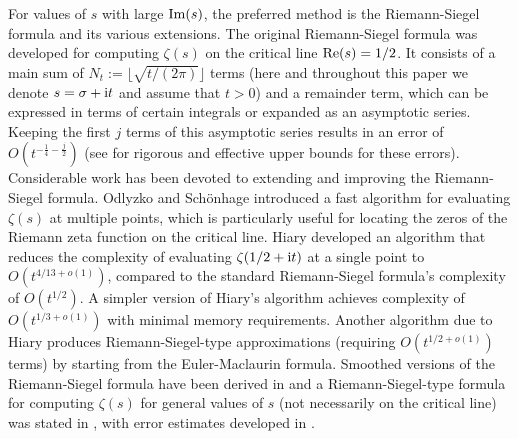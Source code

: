 \documentclass[12pt]{article}
\def\re{\textnormal {Re}}
\def\im{\textnormal {Im}}
\def\i{{\textnormal i}}
\theoremstyle{definition}
\begin{document}
For values of $s$ with large $\im(s)$, the preferred method is the Riemann-Siegel formula and its various extensions. The original Riemann-Siegel formula \cite{Borwein_2000, Gabcke1979,Rubinstein_2005,Titchmarsh1987} was developed for computing $\zeta(s)$ on the critical line $\re(s)=1/2$. It consists of a main sum of $N_t:=\lfloor \sqrt{t/(2\pi)} \rfloor$ terms (here and throughout this paper we denote $s=\sigma+ \i t$ and assume that $t>0$) and a remainder term, which can  be expressed in terms of certain integrals or expanded as an asymptotic series. Keeping the first $j$ terms of this asymptotic series results in an error of $O(t^{-\frac{1}{4} - \frac{j}{2} })$ (see \cite{Gabcke1979} for rigorous and effective upper bounds for these errors).  Considerable work has been devoted to  extending and improving the Riemann-Siegel formula.  Odlyzko and Sch\"onhage \cite{Odlyzko_1988} introduced a fast algorithm for evaluating $\zeta(s)$ at multiple points, which is particularly useful for locating the zeros of the Riemann zeta function on the critical line. Hiary  
\cite{Hiary_2011} developed an algorithm that reduces the complexity of evaluating $\zeta(1/2+\i t)$ at a single point to $O(t^{4/13+o(1)})$, compared to the standard Riemann-Siegel formula's complexity of $O(t^{1/2})$. A simpler  version of Hiary's algorithm \cite{Hiary_2011} achieves complexity of $O(t^{1/3+o(1)})$ with minimal memory requirements. 
Another algorithm due to Hiary \cite{Hiary_2016} produces Riemann-Siegel-type approximations (requiring $O(t^{1/2+o(1)})$ terms) by starting from the Euler-Maclaurin formula. 
Smoothed versions of the Riemann-Siegel formula have been derived in  \cite{Berry_Keating1992,Kuznetsov2023,Paris_Cang1997,Rubinstein_2005}
and a Riemann-Siegel-type formula for computing $\zeta(s)$ for general values of $s$ (not necessarily on the critical line) was stated in \cite{Odlyzko_1988}, with error estimates developed in \cite{Reyna_2011}.
\end{document}
